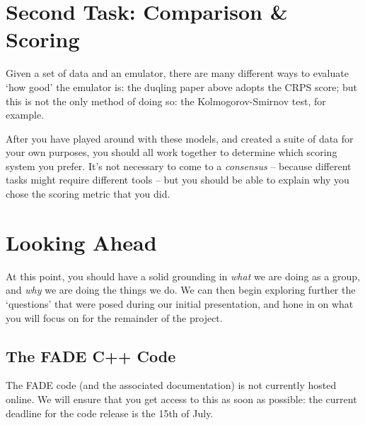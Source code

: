 \documentclass[11pt]{article}
\begin{document}
	\section{Second Task: Comparison \& Scoring}

		Given a set of data and an emulator, there are many different ways to evaluate `how good' the emulator is: the duqling paper above adopts the CRPS score; but this is not the only method of doing so: the Kolmogorov-Smirnov test, for example.

		After you have played around with these models, and created a suite of data for your own purposes, you should all work together to determine which scoring system you prefer. It's not necessary to come to a \textit{consensus} -- because different tasks might require different tools -- but you should be able to explain why you chose the scoring metric that you did.

	\section{Looking Ahead}

		At this point, you should have a solid grounding in \textit{what} we are doing as a group, and \textit{why} we are doing the things we do. We can then begin exploring further the `questions' that were posed during our initial presentation, and hone in on what you will focus on for the remainder of the project.

		\subsection{The FADE C++ Code}

			The FADE code (and the associated documentation) is not currently hosted online. We will ensure that you get access to this as soon as possible: the current deadline for the code release is the 15th of July.
\end{document}
